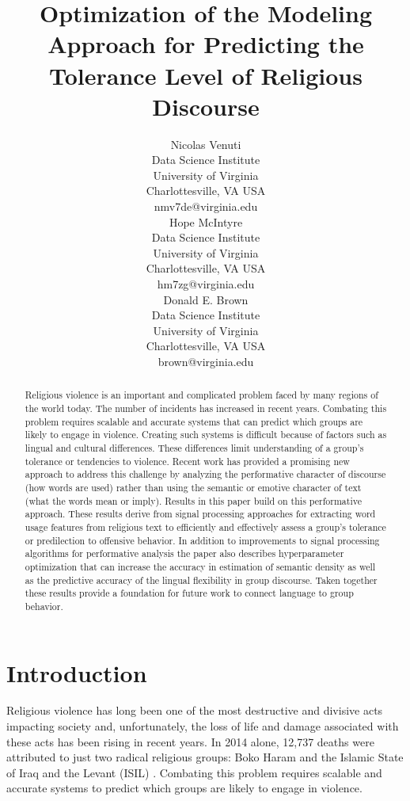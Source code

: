 \documentclass[11pt, a4paper]{article}
\title{Optimization of the Modeling Approach for Predicting the Tolerance Level of Religious Discourse}
\author{Nicolas Venuti \\
  Data Science Institute \\
  University of Virginia \\
  Charlottesville, VA USA \\
  {nmv7de@virginia.edu} \\\And
  Hope McIntyre \\
  Data Science Institute \\
  University of Virginia \\
  Charlottesville, VA USA \\
  {hm7zg@virginia.edu}\\\And
  Donald E. Brown \\
  Data Science Institute \\
  University of Virginia \\
  Charlottesville, VA USA \\
  {brown@virginia.edu} \\}
\date{}
\begin{document}
\maketitle
\begin{abstract}
Religious violence is an important and complicated problem faced by many regions of the world today. The number of incidents has increased in recent years. Combating this problem requires scalable and accurate systems that can predict which groups are likely to engage in violence. Creating such systems is difficult because of factors such as lingual and cultural differences. These differences limit understanding of a group's tolerance or tendencies to violence. Recent work has provided a promising new approach to address this challenge by analyzing the performative character of discourse (how words are used) rather than using the semantic or emotive character of text (what the words mean or imply). Results in this paper build on this performative approach.  These results derive from signal processing approaches for extracting word usage features from religious text to efficiently and effectively assess a group's tolerance or predilection to offensive behavior. In addition to improvements to  signal processing algorithms  for performative analysis the paper also describes hyperparameter optimization that can increase the accuracy in estimation of semantic density as well as the predictive accuracy of the lingual flexibility in group discourse. Taken together these results provide a foundation for future work to connect language to group behavior.  
\end{abstract}

\section{Introduction}\label{Intro}


Religious violence has long been one of the most destructive and divisive acts impacting society and, unfortunately, the loss of life and damage associated with these acts has been rising in recent years. In 2014 alone, 12,737 deaths were attributed to just two  radical religious groups: Boko Haram and the Islamic State of Iraq and the Levant (ISIL) \cite{Searcey2015}. Combating this problem requires scalable and accurate systems to predict which groups are likely to engage in violence. 
\end{document}
